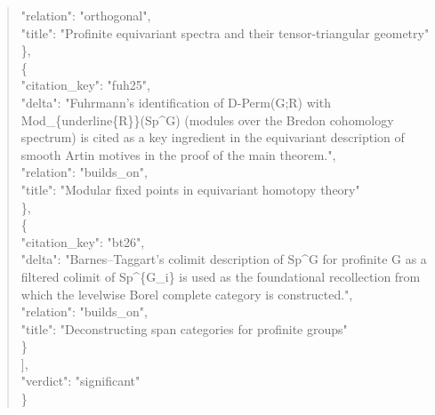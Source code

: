 \documentclass[11pt]{article}
\begin{document}
\begin{quote}
      "relation": "orthogonal",\\
      "title": "Profinite equivariant spectra and their tensor-triangular geometry"\\
    \},\\
    \{\\
      "citation\_key": "fuh25",\\
      "delta": "Fuhrmann's identification of D-Perm(G;R) with Mod\_\{underline\{R\}\}(Sp\^{}G) (modules over the Bredon cohomology spectrum) is cited as a key ingredient in the equivariant description of smooth Artin motives in the proof of the main theorem.",\\
      "relation": "builds\_on",\\
      "title": "Modular fixed points in equivariant homotopy theory"\\
    \},\\
    \{\\
      "citation\_key": "bt26",\\
      "delta": "Barnes--Taggart's colimit description of Sp\^{}G for profinite G as a filtered colimit of Sp\^{}\{G\_i\} is used as the foundational recollection from which the levelwise Borel complete category is constructed.",\\
      "relation": "builds\_on",\\
      "title": "Deconstructing span categories for profinite groups"\\
    \}\\
  ],\\
  "verdict": "significant"\\
\}\\
\end{quote}
\end{document}
